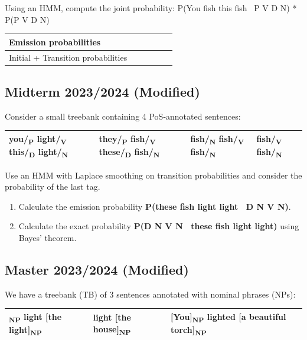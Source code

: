 \documentclass{../extra/aakpract/aakpract}
\begin{document}
	Using an HMM, compute the joint probability: P(You fish this fish \textbar\ P V D N) * P(P V D N)
	
	\begin{center}
		\begin{tabular}{|p{}|p{}|p{}|p{}|p{}|p{}|}
			\hline
			Emission probabilities &&&&&\\
			\hline
			Initial + Transition probabilities &&&&&\\
			\hline
		\end{tabular}
	\end{center}
	
	\subsection{Midterm 2023/2024 (Modified)}
	
	Consider a small treebank containing 4 PoS-annotated sentences:
	\begin{center}
		\begin{tabular}{|l|l|l|l|}
			\hline
			you/\textsubscript{P} light/\textsubscript{V} this/\textsubscript{D} light/\textsubscript{N} &
			they/\textsubscript{P} fish/\textsubscript{V} these/\textsubscript{D} fish/\textsubscript{N} &
			fish/\textsubscript{N} fish/\textsubscript{V} fish/\textsubscript{N} &
			fish/\textsubscript{V} fish/\textsubscript{N} \\
			\hline
		\end{tabular}
	\end{center}
	
	Use an HMM with Laplace smoothing on transition probabilities and consider the probability of the last tag.
	\begin{enumerate}
		\item Calculate the emission probability \textbf{P(these fish light light \textbar\ D N V N)}.
		\item Calculate the exact probability \textbf{P(D N V N \textbar\ these fish light light)} using Bayes' theorem.
	\end{enumerate}
	
	
	\subsection{Master 2023/2024 (Modified)}
	
	We have a treebank (TB) of 3 sentences annotated with nominal phrases (NPs):
	\begin{center}
		\begin{tabular}{|lll|}
			\hline
			[I]\textsubscript{NP} light [the light]\textsubscript{NP} &
			light [the house]\textsubscript{NP} & 
			[You]\textsubscript{NP} lighted [a beautiful torch]\textsubscript{NP} \\
			\hline
		\end{tabular}
	\end{center}
	
\end{document}
